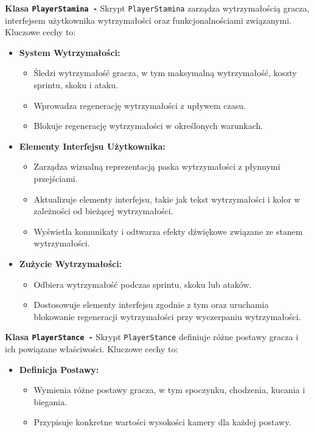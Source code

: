 \textbf{Klasa \texttt{PlayerStamina -}}
Skrypt \texttt{PlayerStamina} zarządza wytrzymałością gracza, interfejsem użytkownika wytrzymałości oraz funkcjonalnościami związanymi. Kluczowe cechy to:
\begin{itemize}
  \item \textbf{System Wytrzymałości:}
    \begin{itemize}
      \item Śledzi wytrzymałość gracza, w tym maksymalną wytrzymałość, koszty sprintu, skoku i ataku.
      \item Wprowadza regenerację wytrzymałości z upływem czasu.
      \item Blokuje regenerację wytrzymałości w określonych warunkach.
    \end{itemize}
  \item \textbf{Elementy Interfejsu Użytkownika:}
    \begin{itemize}
      \item Zarządza wizualną reprezentacją paska wytrzymałości z płynnymi przejściami.
      \item Aktualizuje elementy interfejsu, takie jak tekst wytrzymałości i kolor w zależności od bieżącej wytrzymałości.
      \item Wyświetla komunikaty i odtwarza efekty dźwiękowe związane ze stanem wytrzymałości.
    \end{itemize}
  \item \textbf{Zużycie Wytrzymałości:}
    \begin{itemize}
      \item Odbiera wytrzymałość podczas sprintu, skoku lub ataków.
      \item Dostosowuje elementy interfejsu zgodnie z tym oraz uruchamia blokowanie regeneracji wytrzymałości przy wyczerpaniu wytrzymałości.
    \end{itemize}
\end{itemize}

\textbf{Klasa \texttt{PlayerStance -}}
Skrypt \texttt{PlayerStance} definiuje różne postawy gracza i ich powiązane właściwości. Kluczowe cechy to:
\begin{itemize}
  \item \textbf{Definicja Postawy:}
    \begin{itemize}
      \item Wymienia różne postawy gracza, w tym spoczynku, chodzenia, kucania i biegania.
      \item Przypisuje konkretne wartości wysokości kamery dla każdej postawy.
    \end{itemize}
\end{itemize}

